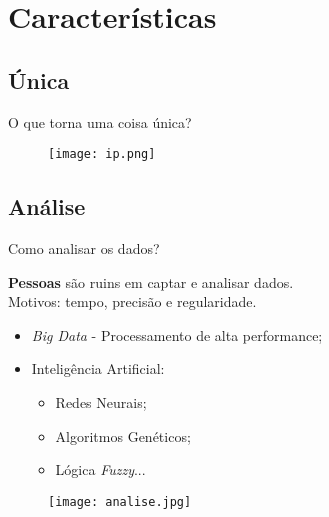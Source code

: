 \section{Características}
\label{sec:caracteristicas}

\subsection*{Única}
\begin{frame}{O que torna uma coisa única?}
	
	\begin{figure}[H]
		\texttt{[image: ip.png]}\footnotemark
	\end{figure}
	
\end{frame}

\subsection*{Análise}
\begin{frame}{Como analisar os dados?}
	\begin{block}{}
		\textbf{Pessoas} são ruins em captar e analisar dados. \\Motivos: tempo, precisão e regularidade.
	\end{block}
	
	\begin{itemize}
		\item \textit{Big Data} - Processamento de alta performance;
		\item Inteligência Artificial: 
		\begin{itemize}
			\item Redes Neurais; 
			\item Algoritmos Genéticos;
			\item Lógica \textit{Fuzzy}...
		\end{itemize}
	\end{itemize}
	
	\begin{figure}[H]
		\texttt{[image: analise.jpg]}\footnotemark
	\end{figure}
	
\end{frame}

